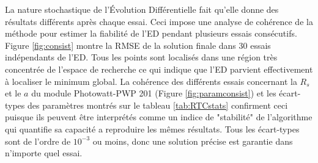 La nature stochastique de l'Évolution Différentielle fait qu'elle donne des résultats différents après chaque essai. Ceci impose une analyse de cohérence de la méthode pour estimer la fiabilité de l'ED pendant plusieurs essais consécutifs. Figure \ref{fig:consist} montre la RMSE de la solution finale dans 30 essais indépendants de l'ED.
Tous les points sont localisés dans une région très concentrée de l'espace de recherche ce qui indique que l'ED parvient effectivement à localiser le minimum global.
La cohérence des différents essais concernant la $R_s$ et le $a$ du module Photowatt-PWP 201 (Figure \ref{fig:paramconsist}) et les écart-types des paramètres montrés sur le tableau \ref{tab:RTCstats} confirment ceci puisque ils peuvent être interprétés comme un indice de "stabilité" de l'algorithme qui quantifie sa capacité a reproduire les mêmes résultats. Tous les écart-types sont de l'ordre de $10^{-3}$ ou moins, donc une solution précise est garantie dans n'importe quel essai.

